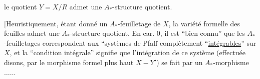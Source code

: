 le quotient  $Y=X/R$ admet une $A_*$-structure quotient.

[Heuristiquement, étant donné un $A_*$-feuilletage de $X$, la variété formelle des feuilles admet une $A_*$-structure quotient. En car. 0, il est ``bien connu'' que les $A_*$-feuilletages correspondent aux ``systèmes de Pfaff complètement ``\uline{intégrables}'' sur $X$, et la ``condition intégrale'' signifie que l'intégration de ce système (effectuée disons, par le morphisme formel plus haut $X\mathbin{-}Y'$) se fait par un $A_*$-morphisme$\ldots\ldots$
